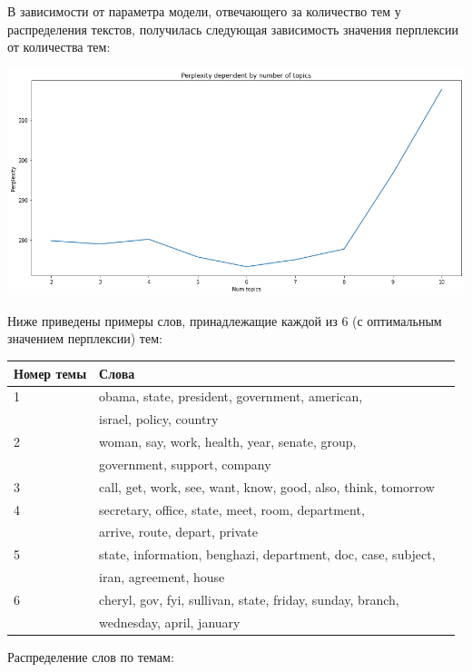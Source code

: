 В зависимости от параметра модели, отвечающего за количество тем у распределения текстов, получилась следующая зависимость значения перплексии от количества тем:

\includegraphics[scale=0.5]{perplexity.png}

Ниже приведены примеры слов, принадлежащие каждой из 6 (с оптимальным значением перплексии) тем:

\begin{tabular}{ | l | l | l | }
\hline
Номер темы & Слова \\ \hline
1 & obama, state, president, government, american, \\ & israel,  policy, country \\ \hline
2 & woman, say, work, health, year, senate, group, \\ & government,  support, company \\ \hline
3 & call, get, work, see, want, know, good, also, think, tomorrow \\ \hline
4 & secretary, office, state, meet, room, department,  \\ &  arrive, route, depart, private \\ \hline 
5 & state, information, benghazi, department, doc, case, subject, \\ & iran, agreement, house \\ \hline
6 & cheryl, gov, fyi, sullivan, state, friday, sunday, branch,  \\ & wednesday, april, january \\ \hline 

\end{tabular}

\newpage

Распределение слов по темам:

